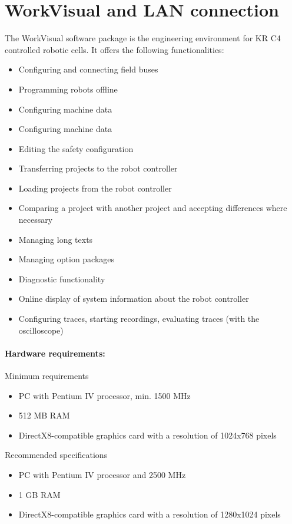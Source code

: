 \section{WorkVisual and LAN connection}
The WorkVisual software package is the engineering environment for KR C4 controlled robotic cells. It offers the following functionalities:
\begin{itemize}
	\item Configuring and connecting field buses
	\item Programming robots offline
	\item Configuring machine data
	\item Configuring machine data
	\item Editing the safety configuration
	\item Transferring projects to the robot controller
	\item Loading projects from the robot controller
	\item Comparing a project with another project and accepting differences where necessary
	\item Managing long texts
	\item Managing option packages
	\item Diagnostic functionality
	\item Online display of system information about the robot controller
	\item Configuring traces, starting recordings, evaluating traces (with the oscilloscope)
\end{itemize}

	\paragraph{Hardware requirements:}
	Minimum requirements 
		\begin{itemize}
			\item PC with Pentium IV processor, min. 1500 MHz
			\item 512 MB RAM
			\item DirectX8-compatible graphics card with a resolution of 1024x768 pixels
		\end{itemize}
	Recommended specifications
		\begin{itemize}
			\item PC with Pentium IV processor and 2500 MHz
			\item 1 GB RAM
			\item DirectX8-compatible graphics card with a resolution of 1280x1024 pixels
		\end{itemize}
